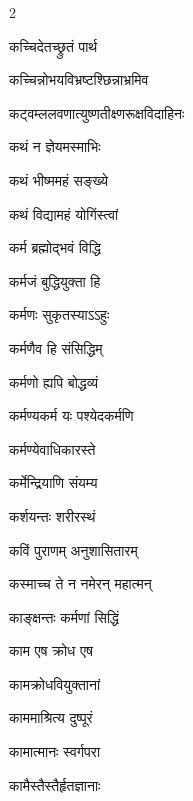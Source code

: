\begin{multicols}{2}
\begin{indexlist}
\item कच्चिदेतच्छ्रुतं पार्थ \dotfill {}
\item कच्चिन्नोभयविभ्रष्टश्छिन्नाभ्रमिव \dotfill {}
\item कट्वम्ललवणात्युष्णतीक्ष्णरूक्षविदाहिनः \dotfill {}
\item कथं न ज्ञेयमस्माभिः \dotfill {}
\item कथं भीष्ममहं सङ्ख्ये \dotfill {}
\item कथं विद्यामहं योगिंस्त्वां \dotfill {}
\item कर्म ब्रह्मोद्भवं विद्धि \dotfill {}
\item कर्मजं बुद्धियुक्ता हि \dotfill {}
\item कर्मणः सुकृतस्याऽऽहुः \dotfill {}
\item कर्मणैव हि संसिद्धिम् \dotfill {}
\item कर्मणो ह्यपि बोद्धव्यं \dotfill {}
\item कर्मण्यकर्म यः पश्येदकर्मणि \dotfill {}
\item कर्मण्येवाधिकारस्ते \dotfill {}
\item कर्मेन्द्रियाणि संयम्य \dotfill {}
\item कर्शयन्तः शरीरस्थं \dotfill {}
\item कविं पुराणम् अनुशासितारम् \dotfill {}
\item कस्माच्च ते न नमेरन् महात्मन् \dotfill {}
\item काङ्क्षन्तः कर्मणां सिद्धिं \dotfill {}
\item काम एष क्रोध एष \dotfill {}
\item कामक्रोधवियुक्तानां \dotfill {}
\item काममाश्रित्य दुष्पूरं \dotfill {}
\item कामात्मानः स्वर्गपरा \dotfill {}
\item कामैस्तैस्तैर्हृतज्ञानाः \dotfill {}

\end{indexlist}
\end{multicols}
